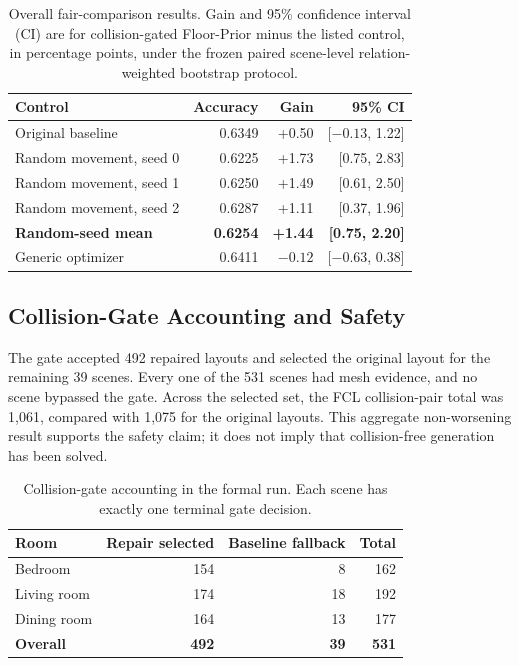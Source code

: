 \documentclass{egpubl}
\newcommand{\fp}{Floor-Prior}
\begin{document}
\begin{table}[t]
\centering
\caption{Overall fair-comparison results. Gain and 95\% confidence interval (CI) are for collision-gated \fp{} minus the listed control, in percentage points, under the frozen paired scene-level relation-weighted bootstrap protocol.}
\label{tab:controls}
\setlength{\tabcolsep}{4pt}
\begin{tabular}{lrrr}
\toprule
Control & Accuracy & Gain & 95\% CI \\
\midrule
Original baseline & 0.6349 & +0.50 & [$-0.13$, 1.22] \\
Random movement, seed 0 & 0.6225 & +1.73 & [0.75, 2.83] \\
Random movement, seed 1 & 0.6250 & +1.49 & [0.61, 2.50] \\
Random movement, seed 2 & 0.6287 & +1.11 & [0.37, 1.96] \\
\textbf{Random-seed mean} & \textbf{0.6254} & \textbf{+1.44} & \textbf{[0.75, 2.20]} \\
Generic optimizer & 0.6411 & $-0.12$ & [$-0.63$, 0.38] \\
\bottomrule
\end{tabular}
\end{table}

\subsection{Collision-Gate Accounting and Safety}

The gate accepted 492 repaired layouts and selected the original layout for the remaining 39 scenes. Every one of the 531 scenes had mesh evidence, and no scene bypassed the gate. Across the selected set, the FCL collision-pair total was 1,061, compared with 1,075 for the original layouts. This aggregate non-worsening result supports the safety claim; it does not imply that collision-free generation has been solved.

\begin{table}[t]
\centering
\caption{Collision-gate accounting in the formal run. Each scene has exactly one terminal gate decision.}
\label{tab:gated}
\begin{tabular}{lrrr}
\toprule
Room & Repair selected & Baseline fallback & Total \\
\midrule
Bedroom & 154 & 8 & 162 \\
Living room & 174 & 18 & 192 \\
Dining room & 164 & 13 & 177 \\
\textbf{Overall} & \textbf{492} & \textbf{39} & \textbf{531} \\
\bottomrule
\end{tabular}
\end{table}
\end{document}
